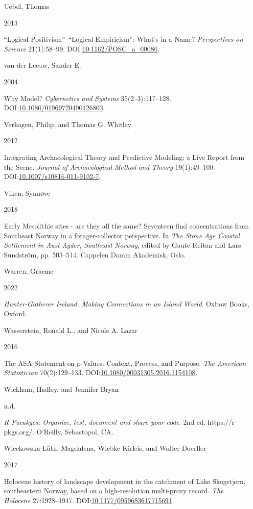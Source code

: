 \documentclass[
  a4paper,
  oneside]{uiophdthesis}
\newlength{\cslhangindent}
\newlength{\csllabelwidth}
\newlength{\cslentryspacingunit} %
\newenvironment{CSLReferences}[2] %
 {%
  \setlength{\parindent}{0pt}
  \ifodd #1
  \let\oldpar\par
  \def\par{\hangindent=\cslhangindent\oldpar}
  \fi
  \setlength{\parskip}{#2\cslentryspacingunit}
 }%
 {}
\newcommand{\CSLBlock}[1]{#1\hfill\break}
\newcommand{\CSLLeftMargin}[1]{\parbox[t]{\csllabelwidth}{#1}}
\newcommand{\CSLRightInline}[1]{\parbox[t]{\linewidth - \csllabelwidth}{#1}\break}
\begin{document}
\begin{CSLReferences}{0}{0}
\leavevmode{}%
\CSLBlock{Uebel, Thomas}
\CSLLeftMargin{ 2013}
\CSLRightInline{{{``Logical Positivism''}--{``Logical Empiricism''}: What's in a Name?} \emph{Perspectives on Science} 21(1):58--99. DOI:\href{https://doi.org/10.1162/POSC_a_00086}{10.1162/POSC\_a\_00086}.}

\leavevmode{}%
\CSLBlock{van der Leeuw, Sander E.}
\CSLLeftMargin{ 2004}
\CSLRightInline{{Why Model?} \emph{Cybernetics and Systems} 35(2--3):117--128. DOI:\href{https://doi.org/10.1080/01969720490426803}{10.1080/01969720490426803}.}

\leavevmode{}%
\CSLBlock{Verhagen, Philip, and Thomas G. Whitley}
\CSLLeftMargin{ 2012}
\CSLRightInline{{Integrating Archaeological Theory and Predictive Modeling: a Live Report from the Scene}. \emph{Journal of Archaeological Method and Theory} 19(1):49--100. DOI:\href{https://doi.org/10.1007/s10816-011-9102-7}{10.1007/s10816-011-9102-7}.}

\leavevmode{}%
\CSLBlock{Viken, Synnøve}
\CSLLeftMargin{ 2018}
\CSLRightInline{{Early Mesolithic sites - are they all the same? Seventeen find concentrations from Southeast Norway in a forager-collector perspective}. In \emph{{The Stone Age Coastal Settlement in Aust-Agder, Southeast Norway}}, edited by Gaute Reitan and Lars Sundström, pp. 503--514. Cappelen Damm Akademisk, Oslo.}

\leavevmode{}%
\CSLBlock{Warren, Graeme}
\CSLLeftMargin{ 2022}
\CSLRightInline{\emph{{Hunter-Gatherer Ireland. Making Connections in an Island World}}. Oxbow Books, Oxford.}

\leavevmode{}%
\CSLBlock{Wasserstein, Ronald L., and Nicole A. Lazar}
\CSLLeftMargin{ 2016}
\CSLRightInline{{The ASA Statement on p-Values: Context, Process, and Purpose}. \emph{The American Statistician} 70(2):129--133. DOI:\href{https://doi.org/10.1080/00031305.2016.1154108}{10.1080/00031305.2016.1154108}.}

\leavevmode{}%
\CSLBlock{Wickham, Hadley, and Jennifer Bryan}
\CSLLeftMargin{ n.d.}
\CSLRightInline{\emph{{R Pacakges: Organize, test, document and share your code}}. 2nd ed. {https://r-pkgs.org/}. O'Reilly, Sebastopol, CA.}

\leavevmode{}%
\CSLBlock{Wieckowska-Lüth, Magdalena, Wiebke Kirleis, and Walter Doerfler}
\CSLLeftMargin{ 2017}
\CSLRightInline{{Holocene history of landscape development in the catchment of Lake Skogstjern, southeastern Norway, based on a high-resolution multi-proxy record}. \emph{The Holocene} 27:1928--1947. DOI:\href{https://doi.org/10.1177/0959683617715691}{10.1177/0959683617715691}.}


\end{CSLReferences}
\end{document}
